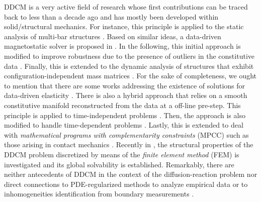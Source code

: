 DDCM is a very active field of research whose first contributions can be traced back to less than a decade ago and has mostly been developed within solid/structural mechanics. For instance, this principle is applied to the static analysis of multi-bar structures \cite{Kirchdoerfer2016}. Based on similar ideas, a data-driven magnetostatic solver is proposed in \cite{Galetzka2020}. In the following, this initial approach is modified to improve robustness due to the presence of outliers in the constitutive data \cite{Kirchdoerfer2017}. Finally, this is extended to the dynamic analysis of structures that exhibit configuration-independent mass matrices \cite{Kirchdoerfer2018}. For the sake of completeness, we ought to mention that there are some works addressing the existence of solutions for data-driven elasticity \cite{Conti2018,Conti2020}. There is also a hybrid approach that relies on a smooth constitutive manifold reconstructed from the data at a off-line pre-step. This principle is applied to time-independent problems \cite{Gebhardt:2020a}. Then, the approach is also modified to handle time-dependent problems \cite{Gebhardt:2020b}. Lastly, this is extended to deal with \textit{mathematical programs with complementarity constraints} (MPCC) such as those arising in contact mechanics  \cite{Gebhardt2024a}. Recently in  \cite{Gebhardt2024b}, the structural properties of the DDCM problem discretized by means of the \textit{finite element method} (FEM) is investigated and its global solvability is established. Remarkably, there are neither antecedents of DDCM in the context of the diffusion-reaction problem nor direct connections to PDE-regularized methods to analyze empirical data \cite{Ponti2021} or to inhomogeneities identification from boundary measurements \cite{Ammari2004}.

